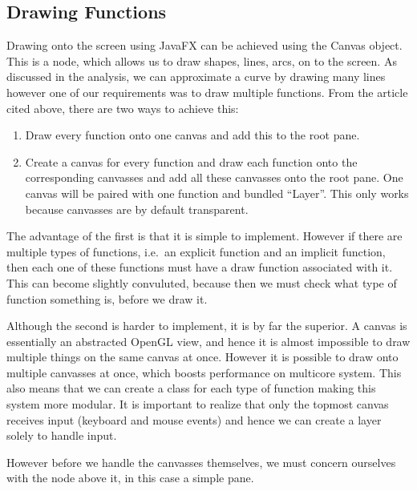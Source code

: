 \documentclass[../../../../../main.tex]{subfiles}
\begin{document}
\subsection{Drawing Functions}
Drawing onto the screen using JavaFX can be achieved using the Canvas\cite{canvas} object. This is a node, which allows us to draw shapes, lines, arcs, on to the screen. As discussed in the analysis, we can approximate a curve by drawing many lines however one of our requirements was to draw multiple functions. From the article cited above, there are two ways to achieve this:
\begin{enumerate}
	\item Draw every function onto one canvas and add this to the root pane.
	\item Create a canvas for every function and draw each function onto the corresponding canvasses and add all these canvasses onto the root pane. One canvas will be paired with one function and bundled ``Layer''. This only works because canvasses are by default transparent.
\end{enumerate}
The advantage of the first is that it is simple to implement. However if there are multiple types of functions, i.e.\ an explicit function and an implicit function, then each one of these functions must have a draw function associated with it. This can become slightly convuluted, because then we must check what type of function something is, before we draw it.

Although the second is harder to implement, it is by far the superior. A canvas is essentially an abstracted OpenGL view, and hence it is almost impossible\cite{openglMultithread} to draw multiple things on the same canvas at once. However it is possible to draw onto multiple canvasses at once, which boosts performance on multicore system. This also means that we can create a class for each type of function making this system more modular. It is important to realize that only the topmost canvas receives input (keyboard and mouse events) and hence we can create a layer solely to handle input.

However before we handle the canvasses themselves, we must concern ourselves with the node above it, in this case a simple pane.
\newpage 
\end{document}
